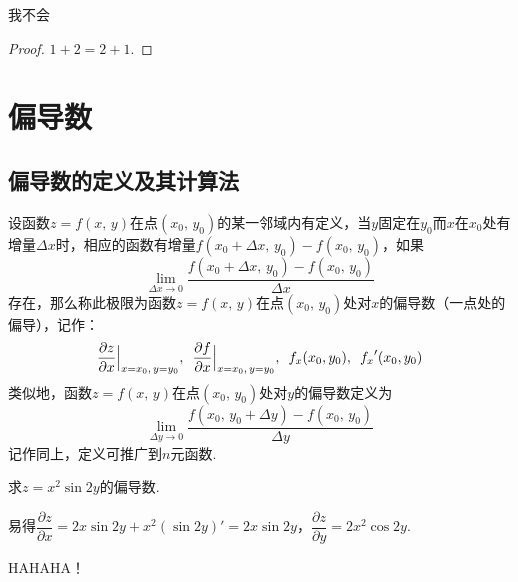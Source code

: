 \documentclass[12pt, a4paper,oneside, UTF8]{ctexbook}
\begin{document}
\begin{rmk}
    我不会
\end{rmk}

\begin{proof}
    $1 + 2 = 2 + 1$.
\end{proof}

\section{偏导数}
\subsection{偏导数的定义及其计算法}
\begin{defn}
    设函数$z=f(x,\,y)$在点$(x_0,\,y_0)$的某一邻域内有定义，当$y$固定在$y_0$而$x$在$x_0$处有增量$\Delta x$时，相应的函数有增量$f(x_0 + \Delta{x},\,y_0) - f(x_0,\,y_0)$，如果
    \[
        \lim_{\Delta{x} \to 0}\frac{f(x_0 + \Delta{x},\,y_0)-f(x_0,\,y_0)}{\Delta{x}}
    \]
    存在，那么称此极限为函数$z=f(x,\,y)$在点$(x_0,\,y_0)$处对$x$的偏导数（一点处的偏导），记作：
    \[
        \frac{\partial z}{\partial x}\Big| _{x=x_0,\, y=y_0} ,\enspace \frac{\partial f}{\partial x}\Big| _{x=x_0,\, y=y_0} ,\enspace f_x(x_0,y_0),\enskip {f_x}'(x_0,y_0)
    \]
    类似地，函数$z=f(x,\,y)$在点$(x_0,\,y_0)$处对$y$的偏导数定义为
    \[
        \lim_{\Delta{y} \to 0}\frac{f(x_0,\,y_0+\Delta{y})-f(x_0,\,y_0)}{\Delta{y}}
    \]
    记作同上，定义可推广到$n$元函数.
\end{defn}

\begin{example}
    求$z = x^2\sin{2y}$的偏导数.
\end{example}
\begin{solution}
    易得$\dfrac{\partial{z}}{\partial{x}} = 2x\sin{2y}+x^2(\sin{2y})' = 2x\sin{2y}$，$\dfrac{\partial{z}}{\partial{y}} = 2x^2\cos{2y}$.
\end{solution}


\begin{center}
    {\LARGE HAHAHA！}
\end{center}

\ifx\allfiles\undefined
\end{document}
